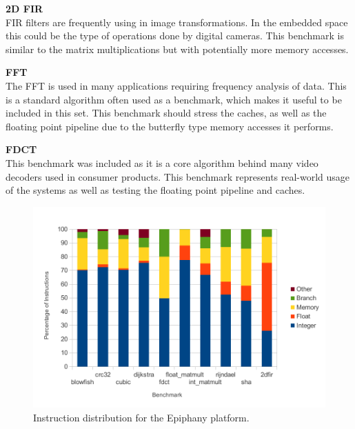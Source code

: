 \documentclass[twocolumn]{article}
\begin{document}
\vspace{3mm}
\textbf{2D FIR}\\
FIR filters are frequently using in image transformations. In the embedded space this could be the type of operations done by digital cameras. This benchmark is similar to the matrix multiplications but with potentially more memory accesses.

\vspace{3mm}
\textbf{FFT}\\
The FFT is used in many applications requiring frequency analysis of data. This is a standard algorithm often used as a benchmark, which makes it useful to be included in this set. This benchmark should stress the caches, as well as the floating point pipeline due to the butterfly type memory accesses it performs.

\vspace{3mm}
\textbf{FDCT}\\
This benchmark was included as it is a core algorithm behind many video decoders used in consumer products. This benchmark represents real-world usage of the systems as well as testing the floating point pipeline and caches.

\begin{figure}[t]
	\includegraphics[width=\linewidth]{epiphany.pdf}
	\caption{Instruction distribution for the Epiphany platform.}
	\label{Fig:InstructionDistributionEpiphany}
\end{figure}
\end{document}
